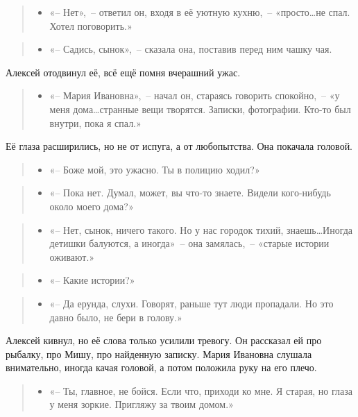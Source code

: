 \documentclass[12pt,a4paper]{book}
\newenvironment{dialogue}{\begin{quote}\itshape\begin{itemize}\item[]}{\end{itemize}\end{quote}}
\begin{document}
\begin{dialogue}
«-- Нет»,~-- ответил он, входя в её уютную кухню,~-- «просто\ldots не спал. Хотел поговорить.»
\end{dialogue}

\begin{dialogue}
«-- Садись, сынок»,~-- сказала она, поставив перед ним чашку чая. 
\end{dialogue}

Алексей отодвинул её, всё ещё помня вчерашний ужас.

\begin{dialogue}
«-- Мария Ивановна»,~-- начал он, стараясь говорить спокойно,~-- «у меня дома\ldots странные вещи творятся. Записки, фотографии. Кто-то был внутри, пока я спал.»
\end{dialogue}

Её глаза расширились, но не от испуга, а от любопытства. Она покачала головой.

\begin{dialogue}
«-- Боже мой, это ужасно. Ты в полицию ходил?»
\end{dialogue}

\begin{dialogue}
«-- Пока нет. Думал, может, вы что-то знаете. Видели кого-нибудь около моего дома?»
\end{dialogue}

\begin{dialogue}
«-- Нет, сынок, ничего такого. Но у нас городок тихий, знаешь\ldots Иногда детишки балуются, а иногда»~-- она замялась,~-- «старые истории оживают.»
\end{dialogue}

\begin{dialogue}
«-- Какие истории?»
\end{dialogue}

\begin{dialogue}
«-- Да ерунда, слухи. Говорят, раньше тут люди пропадали. Но это давно было, не бери в голову.»
\end{dialogue}

Алексей кивнул, но её слова только усилили тревогу. Он рассказал ей про рыбалку, про Мишу, про найденную записку. Мария Ивановна слушала внимательно, иногда качая головой, а потом положила руку на его плечо.

\begin{dialogue}
«-- Ты, главное, не бойся. Если что, приходи ко мне. Я старая, но глаза у меня зоркие. Пригляжу за твоим домом.»
\end{dialogue}
\end{document}

